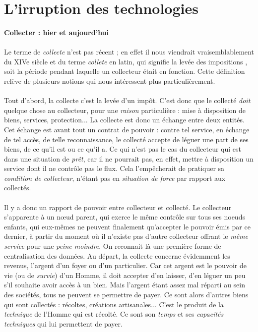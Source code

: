 \section{L'irruption des technologies}

\paragraph{Collecter : hier et aujourd'hui}

\paragraph{} Le terme de \emph{collecte} n'est pas récent ; en effet il nous viendrait vraisemblablement
du XIVe siècle et du terme \emph{collete} en latin, qui signifie la \guillemotleft levée des impositions \guillemotright,
soit la période pendant laquelle un collecteur était en fonction. Cette définition relève de plusieurs notions
qui nous intéressent plus particulièrement.

\paragraph{} Tout d'abord, la collecte c'est la levée d'un impôt. C'est donc que le collecté \emph{doit}
quelque chose au collecteur, pour une \emph{raison} particulière : mise à disposition de biens, services,
protection... La collecte est donc un échange entre deux entités. Cet échange est avant tout un contrat de
pouvoir : contre tel service, en échange de tel accès, de telle reconnaissance, le collecté accepte de
léguer une part de ses biens, de ce qu'il est ou ce qu'il a. Ce qui n'est pas le cas du collecteur qui est
dans une situation de \emph{prêt}, car il ne pourrait pas, en effet, mettre à disposition un service dont
il ne contrôle pas le flux. Cela l'empêcherait de pratiquer sa \emph{condition de collecteur}, n'étant pas en
\emph{situation de force} par rapport aux collectés.

\paragraph{} Il y a donc un rapport de pouvoir entre collecteur et collecté. Le collecteur s'apparente à un n\oe{}ud
parent, qui exerce le même contrôle sur tous ses noeuds enfants, qui eux-mêmes ne peuvent finalement qu'accepter
le pouvoir émis par ce dernier, à partir du moment où il n'existe pas d'autre collecteur offrant le \emph{même
service} pour une \emph{peine moindre}. On reconnait là une première forme de centralisation des données.
Au départ, la collecte concerne évidemment les revenus, l'argent d'un foyer ou d'un particulier. Car cet
argent est le pouvoir de vie (ou de \emph{survie}) d'un Homme, il doit accepter d'en laisser, d'en léguer un peu
s'il souhaite avoir accès à un bien. Mais l'argent étant assez mal réparti au sein des sociétés, tous ne peuvent se
permettre de payer. Ce sont alors d'autres biens qui sont collectés : récoltes, créations artisanales... C'est le
produit de la \emph{technique} de l'Homme qui est récolté. Ce sont son \emph{temps} et ses \emph{capacités techniques}
qui lui permettent de payer.

